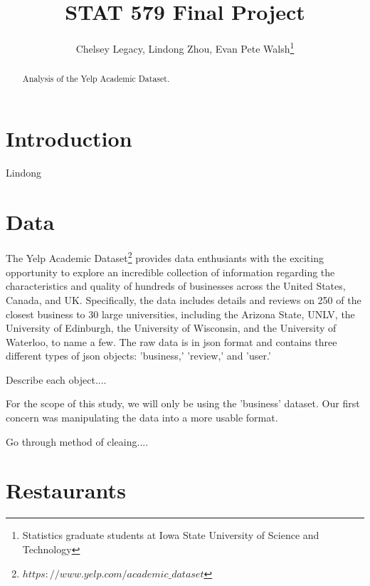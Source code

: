 \documentclass[12pt]{article}
\begin{document}
\author{Chelsey Legacy, Lindong Zhou, Evan Pete Walsh\footnote{Statistics graduate students at Iowa State University of Science and Technology}}
\title{STAT 579 Final Project}
\maketitle

\begin{abstract}
Analysis of the Yelp Academic Dataset.
\end{abstract}

\newpage

\tableofcontents

\newpage

\pagestyle{fancy}
\rhead{\thepage}
\rfoot{\today}
\cfoot{}%


\section{Introduction}

Lindong


\section{Data}

The Yelp Academic Dataset\footnote{$https://www.yelp.com/academic\_dataset$} provides data enthusiants with the exciting opportunity to explore an incredible collection of information regarding the characteristics and quality of hundreds of businesses across the United States, Canada, and UK. Specifically, the data includes details and reviews on 250 of the closest business to 30 large universities, including the Arizona State, UNLV, the University of Edinburgh, the University of Wisconsin, and the University of Waterloo, to name a few. The raw data is in json format and contains three different types of json objects: 'business,' 'review,' and 'user.'

Describe each object....

For the scope of this study, we will only be using the 'business' dataset. Our first concern was manipulating the data into a more usable format.

Go through method of cleaing....


\section{Restaurants}
\end{document}
